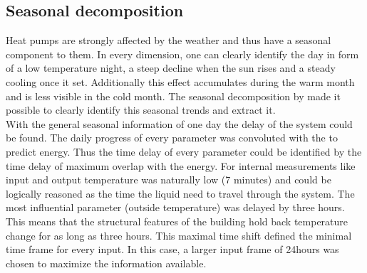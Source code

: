 \documentclass[conference]{IEEEtran}
\begin{document}

\subsection{Seasonal decomposition}
Heat pumps are strongly affected by the weather and thus have a seasonal component to them. In every dimension, one can clearly identify the day in form of a low temperature night, a steep decline when the sun rises and a steady cooling once it set. Additionally this effect accumulates during the warm month and is less visible in the cold month. The seasonal decomposition by \cite{loess} made it possible to clearly identify this seasonal trends and extract it.\\
With the general seasonal information of one day the delay of the system could be found. The daily progress of every parameter was convoluted with the to predict energy. Thus the time delay of every parameter could be identified by the time delay of maximum overlap with the energy. For internal measurements like input and output temperature was naturally low (7 minutes) and could be logically reasoned as the time the liquid need to travel through the system. The most influential parameter (outside temperature) was delayed by three hours. This means that the structural features of the building hold back temperature change for as long as three hours. This maximal time shift defined the minimal time frame for every input. In this case, a larger input frame of 24hours was chosen to maximize the information available.
\end{document}
